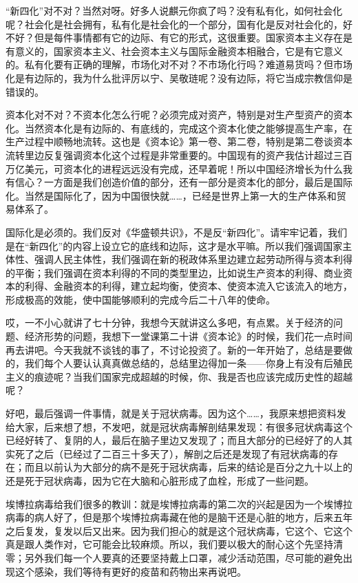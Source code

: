 \documentclass[UTF8, 12pt, a4paper]{ctexrep}
\begin{document}
“新四化”对不对？当然对呀。好多人说麒元你疯了吗？没有私有化，如何社会化呢？社会化是社会拥有，私有化是社会化的一个部分，国有化是反对社会化的，好不好？但是每件事情都有它的边际、有它的形式，这很重要。国家资本主义存在是有意义的，国家资本主义、社会资本主义与国际金融资本相融合，它是有它意义的。私有化要有正确的理解，市场化对不对？不市场化行吗？难道易货吗？但市场化是有边际的，我为什么批评厉以宁、吴敬琏呢？没有边际，将它当成宗教信仰是错误的。

资本化对不对？不资本化怎么行呢？必须完成对资产，特别是对生产型资产的资本化。当然资本化是有边际的、有底线的，完成这个资本化使之能够提高生产率，在生产过程中顺畅地流转。这也是《资本论》第一卷、第二卷，特别是第二卷谈资本流转里边反复强调资本化这个过程是非常重要的。中国现有的资产我估计超过三百万亿美元，可资本化的进程远远没有完成，还早着呢！所以中国经济增长为什么我有信心？一方面是我们创造价值的部分，还有一部分是资本化的部分，最后是国际化。当然是国际化了，因为中国很快就……，已经是世界上第一大的生产体系和贸易体系了。

国际化是必须的。我们反对《华盛顿共识》，不是反“新四化”。请牢牢记着，我们是在“新四化”的内容上设立它的底线和边际，这才是水平嘛。所以我们强调国家主体性、强调人民主体性，我们强调在新的税政体系里边建立起劳动所得与资本利得的平衡；我们强调在资本利得的不同的类型里边，比如说生产资本的利得、商业资本的利得、金融资本的利得，建立起均衡，使资本、使资本流入它该流入的地方，形成极高的效能，使中国能够顺利的完成今后二十八年的使命。

哎，一不小心就讲了七十分钟，我想今天就讲这么多吧，有点累。关于经济的问题、经济形势的问题，我想下一堂课第二十讲《资本论》的时候，我们花一点时间再去讲吧。今天我就不谈钱的事了，不讨论投资了。新的一年开始了，总结是要做的，我们每个人要认认真真做总结的，总结里边得加一条——你身上有没有后殖民主义的痕迹呢？当我们国家完成超越的时候，你、我是否也应该完成历史性的超越呢？

好吧，最后强调一件事情，就是关于冠状病毒。因为这个……，我原来想把资料发给大家，后来想了想，不发吧，就是冠状病毒解剖结果发现：有很多冠状病毒这个已经好转了、复阴的人，最后在脑子里边又发现了；而且大部分的已经好了的人其实死了之后（已经过了二百三十多天了），解剖之后还是发现了有冠状病毒的存在；而且以前认为大部分的病不是死于冠状病毒，后来的结论是百分之九十以上的还是死于冠状病毒，因为它在大脑和心脏形成了血栓，形成了一些问题。

埃博拉病毒给我们很多的教训：就是埃博拉病毒的第二次的兴起是因为一个埃博拉病毒的病人好了，但是那个埃博拉病毒藏在他的是脑干还是心脏的地方，后来五年之后复发，复发以后又出来。因为我们担心的就是这个冠状病毒，它这个、它这个真是跟人类作对，它可能会比较麻烦。所以，我们要以极大的耐心这个先坚持清零；另外我们每一个人要真的还要坚持戴上口罩，减少活动范围，尽可能的避免出现这个感染，我们等待有更好的疫苗和药物出来再说吧。
\end{document}
